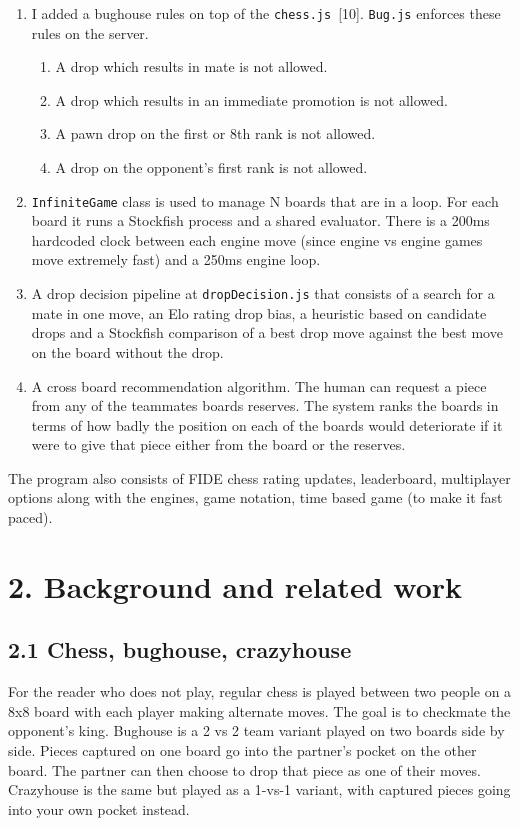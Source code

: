 \documentclass[11pt,a4paper]{article}
\begin{document}
\begin{enumerate}[leftmargin=*]
\item I added a bughouse rules on top of the \texttt{chess.js}~[10]. \texttt{Bug.js} enforces these rules on the server. 
\begin{enumerate}
    \item A drop which results in mate is not allowed. 
    \item A drop which results in an immediate promotion is not allowed. 
    \item A pawn drop on the first or 8th rank is not allowed. 
    \item A drop on the opponent’s first rank is not allowed.
\end{enumerate}
\item \texttt{InfiniteGame} class is used to manage N boards that are in a loop. For each board it runs a Stockfish process and a shared evaluator. There is a 200ms hardcoded clock between each engine move (since engine vs engine games move extremely fast) and a 250ms engine loop.
\item A drop decision pipeline at \texttt{dropDecision.js} that consists of a search for a mate in one move, an Elo rating drop bias, a heuristic based on candidate drops and a Stockfish comparison of a best drop move against the best move on the board without the drop.
\item A cross board recommendation algorithm. The human can request a piece from any of the teammates boards reserves. The system ranks the boards in terms of how badly the position on each of the boards would deteriorate if it were to give that piece either from the board or the reserves.

\end{enumerate}

The program also consists of FIDE chess rating updates, leaderboard, multiplayer options along with the engines, game notation, time based game (to make it fast paced).

\newpage
\section*{2. Background and related work}
\subsection*{2.1 Chess, bughouse, crazyhouse}
For the reader who does not play, regular chess is played between two people on a 8x8 board with each player making alternate moves. The goal is to checkmate the opponent’s king. Bughouse is a 2 vs 2 team variant played on two boards side by side. Pieces captured on one board go into the partner’s pocket on the other board. The partner can then choose to drop that piece as one of their moves. Crazyhouse is the same but played as a 1-vs-1 variant, with captured pieces going into your own pocket instead.
\end{document}
